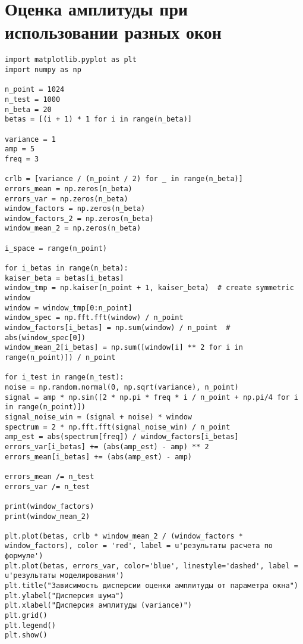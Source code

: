 \chapter{Оценка амплитуды при использовании разных окон}\label{app:Д}
\begin{verbatim}
import matplotlib.pyplot as plt
import numpy as np

n_point = 1024
n_test = 1000
n_beta = 20
betas = [(i + 1) * 1 for i in range(n_beta)]

variance = 1
amp = 5
freq = 3

crlb = [variance / (n_point / 2) for _ in range(n_beta)]
errors_mean = np.zeros(n_beta)
errors_var = np.zeros(n_beta)
window_factors = np.zeros(n_beta)
window_factors_2 = np.zeros(n_beta)
window_mean_2 = np.zeros(n_beta)

i_space = range(n_point)

for i_betas in range(n_beta):
kaiser_beta = betas[i_betas]
window_tmp = np.kaiser(n_point + 1, kaiser_beta)  # create symmetric window
window = window_tmp[0:n_point]
window_spec = np.fft.fft(window) / n_point
window_factors[i_betas] = np.sum(window) / n_point  # abs(window_spec[0])
window_mean_2[i_betas] = np.sum([window[i] ** 2 for i in range(n_point)]) / n_point

for i_test in range(n_test):
noise = np.random.normal(0, np.sqrt(variance), n_point)
signal = amp * np.sin([2 * np.pi * freq * i / n_point + np.pi/4 for i in range(n_point)])
signal_noise_win = (signal + noise) * window
spectrum = 2 * np.fft.fft(signal_noise_win) / n_point
amp_est = abs(spectrum[freq]) / window_factors[i_betas]
errors_var[i_betas] += (abs(amp_est) - amp) ** 2
errors_mean[i_betas] += (abs(amp_est) - amp)

errors_mean /= n_test
errors_var /= n_test

print(window_factors)
print(window_mean_2)

plt.plot(betas, crlb * window_mean_2 / (window_factors * window_factors), color = 'red', label = u'результаты расчета по формуле')
plt.plot(betas, errors_var, color='blue', linestyle='dashed', label = u'результаты моделирования')
plt.title("Зависимость дисперсии оценки амплитуды от параметра окна")
plt.ylabel("Дисперсия шума")
plt.xlabel("Дисперсия амплитуды (variance)")
plt.grid()
plt.legend()
plt.show()
\end{verbatim}

